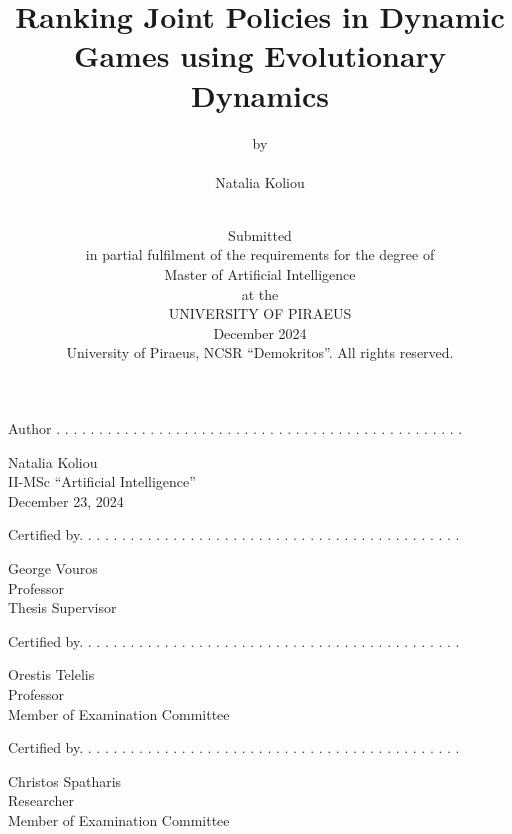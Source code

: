 \documentclass[12pt]{article}
\title{Ranking Joint Policies in Dynamic Games using Evolutionary Dynamics}
\author{by  \\~\\ \Large{Natalia Koliou} \\~\\}
\date{Submitted \\[14pt]
      in partial fulfilment of the requirements for the degree of \\[14pt]
      Master of Artificial Intelligence \\[14pt]
      at the \\[14pt]
      UNIVERSITY OF PIRAEUS \\[20pt]
      December 2024 \\[40pt]
      \footnotesize{University of Piraeus, NCSR “Demokritos”. All rights reserved.} }
\theoremstyle{italicdefinition}
\begin{document}
\begin{figure}
\end{figure}

\maketitle
\thispagestyle{empty}
\newpage

Author . . . . . . . . . . . . . . . . . . . . . . . . . . . . . . . . . . . . . . . . . . . . . . . .\\
\begin{flushright}
    Natalia Koliou \\ 
    II-MSc “Artificial Intelligence” \\ 
    December 23, 2024 \\[4\baselineskip]
\end{flushright}

Certified by. . . . . . . . . . . . . . . . . . . . . . . . . . . . . . . . . . . . . . . . . . . . .

\begin{flushright}
    George Vouros \\ 
    Professor \\
    Thesis Supervisor \\[6\baselineskip]
\end{flushright}

Certified by. . . . . . . . . . . . . . . . . . . . . . . . . . . . . . . . . . . . . . . . . . . . .

\begin{flushright}
    Orestis Telelis \\ 
    Professor \\
    Member of  Examination Committee \\[6\baselineskip]
\end{flushright}

Certified by. . . . . . . . . . . . . . . . . . . . . . . . . . . . . . . . . . . . . . . . . . . . .
\begin{flushright}
    Christos Spatharis \\ 
    Researcher \\
    Member of  Examination Committee
\end{flushright}
\end{document}
